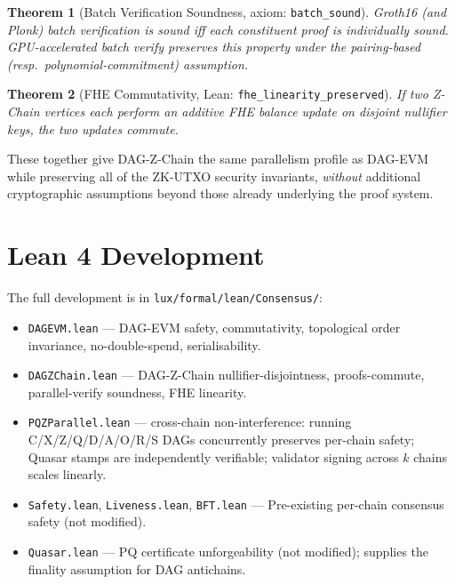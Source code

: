 \documentclass[11pt]{article}
\newtheorem{theorem}{Theorem}
\theoremstyle{definition}
\begin{document}
\begin{theorem}[Batch Verification Soundness, axiom: \texttt{batch\_sound}]
Groth16 (and Plonk) batch verification is sound iff each constituent proof
is individually sound. GPU-accelerated batch verify preserves this property
under the pairing-based (resp.\ polynomial-commitment) assumption.
\end{theorem}

\begin{theorem}[FHE Commutativity, Lean: \texttt{fhe\_linearity\_preserved}]
If two Z-Chain vertices each perform an additive FHE balance update on
disjoint nullifier keys, the two updates commute.
\end{theorem}

These together give DAG-Z-Chain the same parallelism profile as DAG-EVM
while preserving all of the ZK-UTXO security invariants, \emph{without}
additional cryptographic assumptions beyond those already underlying the
proof system.

\section{Lean 4 Development}
\label{sec:lean}

The full development is in \texttt{lux/formal/lean/Consensus/}:

\begin{itemize}
  \item \texttt{DAGEVM.lean} — DAG-EVM safety, commutativity, topological
    order invariance, no-double-spend, serialisability.
  \item \texttt{DAGZChain.lean} — DAG-Z-Chain nullifier-disjointness,
    proofs-commute, parallel-verify soundness, FHE linearity.
  \item \texttt{PQZParallel.lean} — cross-chain non-interference: running
    C/X/Z/Q/D/A/O/R/S DAGs concurrently preserves per-chain safety;
    Quasar stamps are independently verifiable; validator signing across
    $k$ chains scales linearly.
  \item \texttt{Safety.lean}, \texttt{Liveness.lean}, \texttt{BFT.lean} —
    Pre-existing per-chain consensus safety (not modified).
  \item \texttt{Quasar.lean} — PQ certificate unforgeability (not
    modified); supplies the finality assumption for DAG antichains.
\end{itemize}
\end{document}
